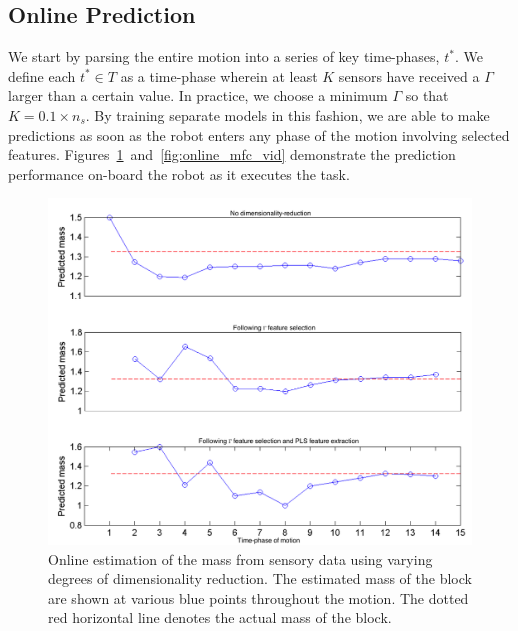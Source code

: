 \subsection{Online Prediction}

We start by parsing the entire motion into a series of key time-phases, $t^*$.
We define each $t^* \in T$ as a time-phase wherein at least $K$ sensors have received a $\Gamma$ larger than a certain value.
In practice, we choose a minimum $\Gamma$ so that $K=0.1 \times n_s$.
By training separate models in this fashion, we are able to make predictions as soon as the robot enters any phase of the motion involving selected features.
Figures~\ref{fig:online}~and~\ref{fig:online_mfc_vid} demonstrate the prediction performance on-board the robot as it executes the task.

\begin{figure}[]
	\centering
	\includegraphics[width=\linewidth]{images/online_m}
	\caption{Online estimation of the mass from sensory data using varying degrees of dimensionality reduction. The estimated mass of the block are shown at various blue points throughout the motion. The dotted red horizontal line denotes the actual mass of the block. }
	\label{fig:online}
\end{figure}

